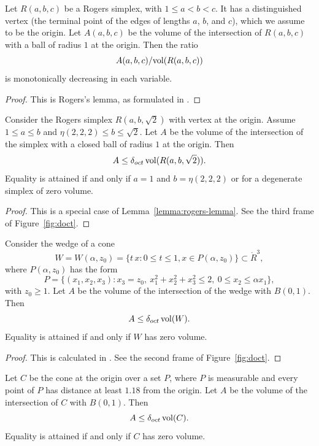 \begin{lemma} \label{lemma:rogers-lemma}
Let $R(a,b,c)$ be a Rogers simplex, with $1\le a < b < c$.  It has
a distinguished vertex (the terminal point of the edges of lengths
$a$, $b$, and $c$), which we assume to be the origin. Let
$A(a,b,c)$ be the volume of the intersection of $R(a,b,c)$ with a
ball of radius $1$ at the origin.  Then the ratio
    $$A(a,b,c)/{\operatorname{vol}}(R(a,b,c))$$
is monotonically decreasing in each variable.
\end{lemma}
\begin{proof}
    This is Rogers's lemma, as formulated in \cite[Lemma~8.6]{part1}.
\end{proof}


\begin{lemma} \label{lemma:rogers-app} Consider the Rogers simplex $R(a,b,\sqrt2)$ with vertex
at the origin.  Assume $1\le a\le b$ and $\eta(2,2,2)\le
b\le\sqrt2$. Let $A$ be the volume of the intersection of the
simplex with a closed ball of radius $1$ at the origin. Then
    $$A\le \delta_{oct}\,{\operatorname{vol}}(R(a,b,\sqrt2)).$$
Equality is attained if and only if $a=1$ and $b=\eta(2,2,2)$ or for
a degenerate simplex of zero volume.
\end{lemma}

\begin{proof} This is a special case of Lemma~\ref{lemma:rogers-lemma}. See the third
frame of Figure~\ref{fig:doct}.
\end{proof}

\begin{lemma} \label{lemma:wedge} Consider the wedge of a cone
    $$
    W =W(\alpha,z_0) =
    \{ t\, x : 0\le t \le 1, x\in P(\alpha,z_0)\}\subset\ring{R}^3,
    $$
where $P(\alpha,z_0)$ has the form
    $$
    P = \{(x_1,x_2,x_3) :
    x_3 = z_0,\   x_1^2+x_2^2+x_3^2\le 2,\ 0\le x_2\le \alpha x_1\},
    $$
with $z_0\ge1$.  Let $A$ be the volume of the intersection of the
wedge with $B(0,1)$. Then
    $$A\le\delta_{oct}\,{\operatorname{vol}}(W).$$
Equality is attained if and only if $W$ has zero volume.
\end{lemma}

\begin{proof} This is calculated in \cite[Sec. 4]{part2}.  See the
second frame of Figure~\ref{fig:doct}.
\end{proof}

\begin{lemma} \label{lemma:cone}
Let $C$ be the cone at the origin over a set $P$, where $P$ is
measurable and every point of $P$ has distance at least $1.18$
from the origin.  Let $A$ be the volume of the intersection of $C$
with $B(0,1)$. Then
    $$A\le\delta_{oct}\,{\operatorname{vol}}(C).$$
Equality is attained if and only if $C$ has zero volume.
\end{lemma}

